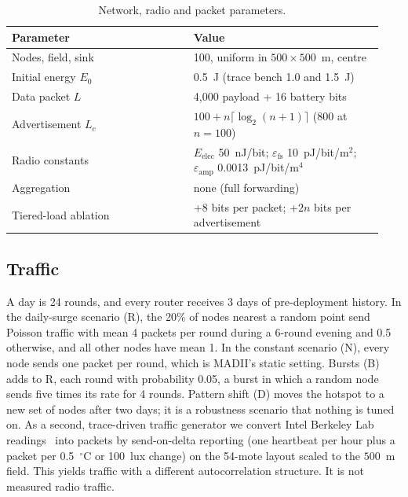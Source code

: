 \begin{table}[t]
\centering
\caption{Network, radio and packet parameters.}\label{tab:params}
\footnotesize
\begin{adjustbox}{max width=\linewidth}
\begin{tabular}{@{}L{0.46\linewidth}L{0.48\linewidth}@{}}
\toprule
Parameter & Value\\
\midrule
Nodes, field, sink & 100, uniform in $500\times500$~m, centre\\
Initial energy $E_0$ & 0.5~J (trace bench 1.0 and 1.5~J)\\
Data packet $L$ & 4{,}000 payload + 16 battery bits\\
Advertisement $L_c$ & $100 + n\lceil\log_2(n+1)\rceil$ (800 at $n=100$)\\
Radio constants & $E_{\mathrm{elec}}$ 50~nJ/bit; $\varepsilon_{\mathrm{fs}}$ 10~pJ/bit/m$^2$; $\varepsilon_{\mathrm{amp}}$ 0.0013~pJ/bit/m$^4$\\
Aggregation & none (full forwarding)\\
Tiered-load ablation & +8 bits per packet; +$2n$ bits per advertisement\\
\bottomrule
\end{tabular}
\end{adjustbox}
\end{table}

\subsection{Traffic}\label{sec:traffic}
A day is 24 rounds, and every router receives 3 days of pre-deployment history. In the daily-surge scenario (R), the 20\% of nodes nearest a random point send Poisson traffic with mean 4 packets per round during a 6-round evening and 0.5 otherwise, and all other nodes have mean 1. In the constant scenario (N), every node sends one packet per round, which is MADII's static setting. Bursts (B) adds to R, each round with probability 0.05, a burst in which a random node sends five times its rate for 4 rounds. Pattern shift (D) moves the hotspot to a new set of nodes after two days; it is a robustness scenario that nothing is tuned on. As a second, trace-driven traffic generator we convert Intel Berkeley Lab readings~\cite{intellab2004} into packets by send-on-delta reporting (one heartbeat per hour plus a packet per 0.5~$^\circ$C or 100~lux change) on the 54-mote layout scaled to the $500$~m field. This yields traffic with a different autocorrelation structure. It is not measured radio traffic.


